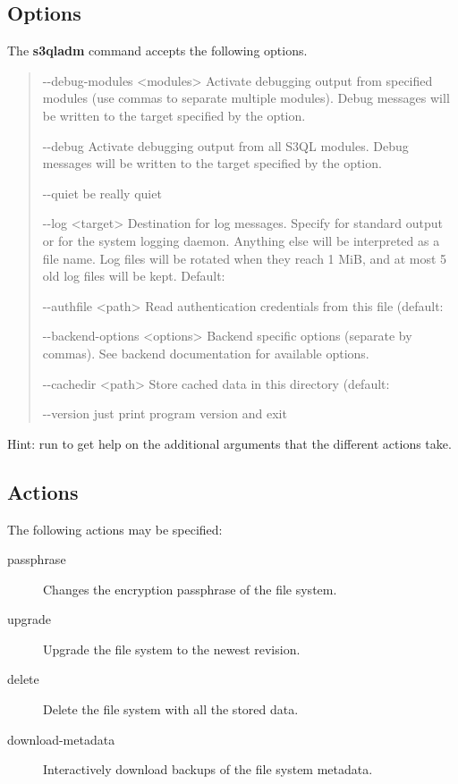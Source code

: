 \documentclass[letterpaper,10pt,english]{sphinxmanual}
\begin{document}
\subsection{Options}
\label{man/adm:options}
The \textbf{s3qladm} command accepts the following options.
\begin{quote}
\begin{optionlist}{3cm}
\item [-{-}debug-modules \textless{}modules\textgreater{}]  
Activate debugging output from specified modules (use
commas to separate multiple modules). Debug messages
will be written to the target specified by the
 option.
\item [-{-}debug]  
Activate debugging output from all S3QL modules. Debug
messages will be written to the target specified by
the  option.
\item [-{-}quiet]  
be really quiet
\item [-{-}log \textless{}target\textgreater{}]  
Destination for log messages. Specify  for
standard output or  for the system logging
daemon. Anything else will be interpreted as a file
name. Log files will be rotated when they reach 1 MiB,
and at most 5 old log files will be kept. Default:
\item [-{-}authfile \textless{}path\textgreater{}]  
Read authentication credentials from this file
(default: 
\item [-{-}backend-options \textless{}options\textgreater{}]  
Backend specific options (separate by commas). See
backend documentation for available options.
\item [-{-}cachedir \textless{}path\textgreater{}]  
Store cached data in this directory (default:
\item [-{-}version]  
just print program version and exit
\end{optionlist}
\end{quote}

Hint: run  to get help on the additional arguments
that the different actions take.


\subsection{Actions}
\label{man/adm:actions}
The following actions may be specified:
\begin{description}
\item[{passphrase}] \leavevmode
Changes the encryption passphrase of the file system.

\item[{upgrade}] \leavevmode
Upgrade the file system to the newest revision.

\item[{delete}] \leavevmode
Delete the file system with all the stored data.

\item[{download-metadata}] \leavevmode
Interactively download backups of the file system metadata.

\end{description}
\end{document}
